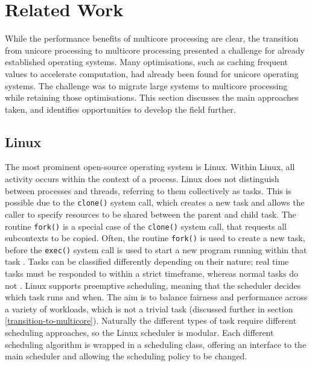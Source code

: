\documentclass[bsc,frontabs,singlespacing,parskip,deptreport]{infthesis}
\begin{document}




\section{Related Work} \label{related-work}
While the performance benefits of multicore processing are clear, the transition from unicore processing to multicore processing presented a challenge for already established operating systems. Many optimisations, such as caching frequent values to accelerate computation, had already been found for unicore operating systems. The challenge was to migrate large systems to multicore processing while retaining those optimisations. This section discusses the main approaches taken, and identifies opportunities to develop the field further.

\subsection{Linux}
The most prominent open-source operating system is Linux. Within Linux, all activity occurs within the context of a process. Linux does not distinguish between processes and threads, referring to them collectively as tasks. This is possible due to the \verb|clone()| system call, which creates a new task and allows the caller to specify resources to be shared between the parent and child task. The routine \verb|fork()| is a special case of the \verb|clone()| system call, that requests all subcontexts to be copied. Often, the routine \verb|fork()| is used to create a new task, before the \verb|exec()| system call is used to start a new program running within that task \cite{silberschatz}. Tasks can be classified differently depending on their nature; real time tasks must be responded to within a strict timeframe, whereas normal tasks do not \cite{seeker}. Linux supports preemptive scheduling, meaning that the scheduler decides which task runs and when. The aim is to balance fairness and performance across a variety of workloads, which is not a trivial task (discussed further in section \ref{transition-to-multicore}). Naturally the different types of task require different scheduling approaches, so the Linux scheduler is modular. Each different scheduling algorithm is wrapped in a scheduling class, offering an interface to the main scheduler \cite{seeker} and allowing the scheduling policy to be changed. 
\end{document}
